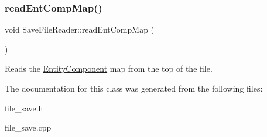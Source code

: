 \subsubsection{\texorpdfstring{read\+Ent\+Comp\+Map()}{readEntCompMap()}}
{\footnotesize\ttfamily void Save\+File\+Reader\+::read\+Ent\+Comp\+Map (\begin{DoxyParamCaption}{ }\end{DoxyParamCaption})}

Reads the \hyperlink{class_entity_component}{Entity\+Component} map from the top of the file. 

The documentation for this class was generated from the following files\+:\begin{DoxyCompactItemize}
\item 
file\+\_\+save.\+h\item 
file\+\_\+save.\+cpp\end{DoxyCompactItemize}
